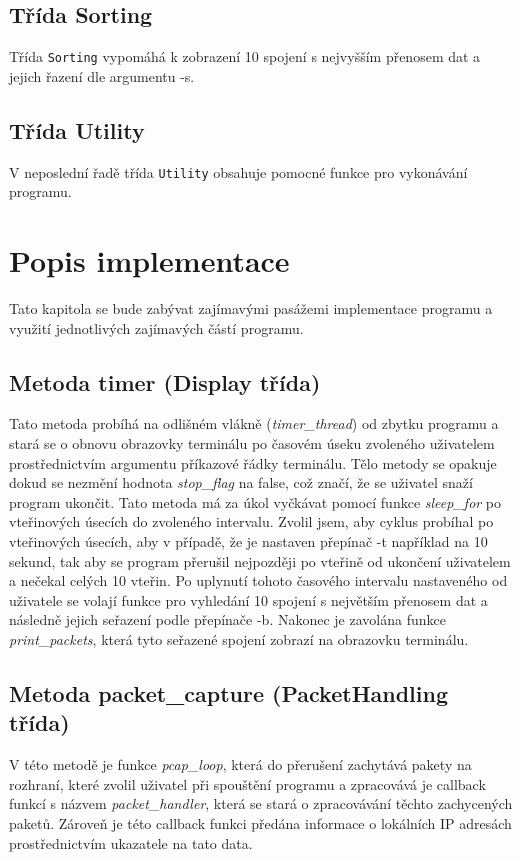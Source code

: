 \documentclass[a4paper, 11pt, hidelinks]{article}
\begin{document}
\subsection{Třída Sorting}
Třída \verb|Sorting| vypomáhá k zobrazení 10 spojení s nejvyšším přenosem dat a jejich řazení dle argumentu -s.

\subsection{Třída Utility}
V neposlední řadě třída \verb|Utility| obsahuje pomocné funkce pro vykonávání programu.

\newpage
\section{Popis implementace}
Tato kapitola se bude zabývat zajímavými pasážemi implementace programu a využití jednotlivých zajímavých částí programu.

\subsection{Metoda timer (Display třída)}
Tato metoda probíhá na odlišném vlákně (\emph{timer\_thread}) od zbytku programu a stará se o obnovu obrazovky terminálu po časovém úseku zvoleného uživatelem prostřednictvím argumentu příkazové řádky terminálu. Tělo metody se opakuje dokud se nezmění hodnota \emph{stop\_flag} na false, což značí, že se uživatel snaží program ukončit. Tato metoda má za úkol vyčkávat pomocí funkce \emph{sleep\_for} po vteřinových úsecích do zvoleného intervalu. Zvolil jsem, aby cyklus probíhal po vteřinových úsecích, aby v případě, že je nastaven přepínač -t například na 10 sekund, tak aby se program přerušil nejpozději po vteřině od ukončení uživatelem a nečekal celých 10 vteřin. Po uplynutí tohoto časového intervalu nastaveného od uživatele se volají funkce pro vyhledání 10 spojení s největším přenosem dat a následně jejich seřazení podle přepínače -b. Nakonec je zavolána funkce \emph{print\_packets}, která tyto seřazené spojení zobrazí na obrazovku terminálu.

\subsection{Metoda packet\_capture (PacketHandling třída)}
V této metodě je funkce \emph{pcap\_loop}, která do přerušení zachytává pakety na rozhraní, které zvolil uživatel při spouštění programu a zpracovává je callback funkcí s názvem \emph{packet\_handler}, která se stará o zpracovávání těchto zachycených paketů. Zároveň je této callback funkci předána informace o lokálních IP adresách prostřednictvím ukazatele na tato data.
\end{document}
